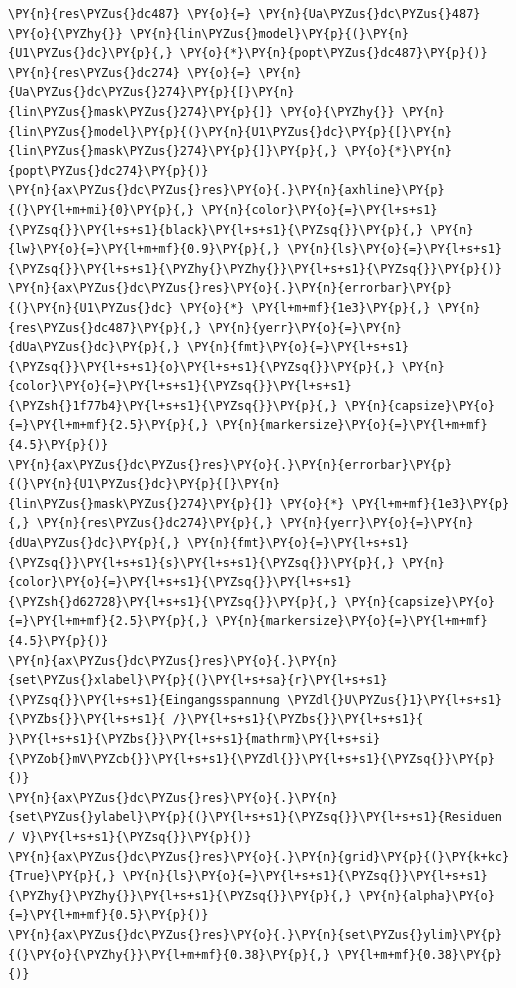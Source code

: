 \begin{tcolorbox}[breakable, size=fbox, boxrule=1pt, pad at break*=1mm,colback=cellbackground, colframe=cellborder]
\begin{Verbatim}[commandchars=\\\{\}]
\PY{n}{res\PYZus{}dc487} \PY{o}{=} \PY{n}{Ua\PYZus{}dc\PYZus{}487} \PY{o}{\PYZhy{}} \PY{n}{lin\PYZus{}model}\PY{p}{(}\PY{n}{U1\PYZus{}dc}\PY{p}{,} \PY{o}{*}\PY{n}{popt\PYZus{}dc487}\PY{p}{)}
\PY{n}{res\PYZus{}dc274} \PY{o}{=} \PY{n}{Ua\PYZus{}dc\PYZus{}274}\PY{p}{[}\PY{n}{lin\PYZus{}mask\PYZus{}274}\PY{p}{]} \PY{o}{\PYZhy{}} \PY{n}{lin\PYZus{}model}\PY{p}{(}\PY{n}{U1\PYZus{}dc}\PY{p}{[}\PY{n}{lin\PYZus{}mask\PYZus{}274}\PY{p}{]}\PY{p}{,} \PY{o}{*}\PY{n}{popt\PYZus{}dc274}\PY{p}{)}
\PY{n}{ax\PYZus{}dc\PYZus{}res}\PY{o}{.}\PY{n}{axhline}\PY{p}{(}\PY{l+m+mi}{0}\PY{p}{,} \PY{n}{color}\PY{o}{=}\PY{l+s+s1}{\PYZsq{}}\PY{l+s+s1}{black}\PY{l+s+s1}{\PYZsq{}}\PY{p}{,} \PY{n}{lw}\PY{o}{=}\PY{l+m+mf}{0.9}\PY{p}{,} \PY{n}{ls}\PY{o}{=}\PY{l+s+s1}{\PYZsq{}}\PY{l+s+s1}{\PYZhy{}\PYZhy{}}\PY{l+s+s1}{\PYZsq{}}\PY{p}{)}
\PY{n}{ax\PYZus{}dc\PYZus{}res}\PY{o}{.}\PY{n}{errorbar}\PY{p}{(}\PY{n}{U1\PYZus{}dc} \PY{o}{*} \PY{l+m+mf}{1e3}\PY{p}{,} \PY{n}{res\PYZus{}dc487}\PY{p}{,} \PY{n}{yerr}\PY{o}{=}\PY{n}{dUa\PYZus{}dc}\PY{p}{,} \PY{n}{fmt}\PY{o}{=}\PY{l+s+s1}{\PYZsq{}}\PY{l+s+s1}{o}\PY{l+s+s1}{\PYZsq{}}\PY{p}{,} \PY{n}{color}\PY{o}{=}\PY{l+s+s1}{\PYZsq{}}\PY{l+s+s1}{\PYZsh{}1f77b4}\PY{l+s+s1}{\PYZsq{}}\PY{p}{,} \PY{n}{capsize}\PY{o}{=}\PY{l+m+mf}{2.5}\PY{p}{,} \PY{n}{markersize}\PY{o}{=}\PY{l+m+mf}{4.5}\PY{p}{)}
\PY{n}{ax\PYZus{}dc\PYZus{}res}\PY{o}{.}\PY{n}{errorbar}\PY{p}{(}\PY{n}{U1\PYZus{}dc}\PY{p}{[}\PY{n}{lin\PYZus{}mask\PYZus{}274}\PY{p}{]} \PY{o}{*} \PY{l+m+mf}{1e3}\PY{p}{,} \PY{n}{res\PYZus{}dc274}\PY{p}{,} \PY{n}{yerr}\PY{o}{=}\PY{n}{dUa\PYZus{}dc}\PY{p}{,} \PY{n}{fmt}\PY{o}{=}\PY{l+s+s1}{\PYZsq{}}\PY{l+s+s1}{s}\PY{l+s+s1}{\PYZsq{}}\PY{p}{,} \PY{n}{color}\PY{o}{=}\PY{l+s+s1}{\PYZsq{}}\PY{l+s+s1}{\PYZsh{}d62728}\PY{l+s+s1}{\PYZsq{}}\PY{p}{,} \PY{n}{capsize}\PY{o}{=}\PY{l+m+mf}{2.5}\PY{p}{,} \PY{n}{markersize}\PY{o}{=}\PY{l+m+mf}{4.5}\PY{p}{)}
\PY{n}{ax\PYZus{}dc\PYZus{}res}\PY{o}{.}\PY{n}{set\PYZus{}xlabel}\PY{p}{(}\PY{l+s+sa}{r}\PY{l+s+s1}{\PYZsq{}}\PY{l+s+s1}{Eingangsspannung \PYZdl{}U\PYZus{}1}\PY{l+s+s1}{\PYZbs{}}\PY{l+s+s1}{ /}\PY{l+s+s1}{\PYZbs{}}\PY{l+s+s1}{ }\PY{l+s+s1}{\PYZbs{}}\PY{l+s+s1}{mathrm}\PY{l+s+si}{\PYZob{}mV\PYZcb{}}\PY{l+s+s1}{\PYZdl{}}\PY{l+s+s1}{\PYZsq{}}\PY{p}{)}
\PY{n}{ax\PYZus{}dc\PYZus{}res}\PY{o}{.}\PY{n}{set\PYZus{}ylabel}\PY{p}{(}\PY{l+s+s1}{\PYZsq{}}\PY{l+s+s1}{Residuen / V}\PY{l+s+s1}{\PYZsq{}}\PY{p}{)}
\PY{n}{ax\PYZus{}dc\PYZus{}res}\PY{o}{.}\PY{n}{grid}\PY{p}{(}\PY{k+kc}{True}\PY{p}{,} \PY{n}{ls}\PY{o}{=}\PY{l+s+s1}{\PYZsq{}}\PY{l+s+s1}{\PYZhy{}\PYZhy{}}\PY{l+s+s1}{\PYZsq{}}\PY{p}{,} \PY{n}{alpha}\PY{o}{=}\PY{l+m+mf}{0.5}\PY{p}{)}
\PY{n}{ax\PYZus{}dc\PYZus{}res}\PY{o}{.}\PY{n}{set\PYZus{}ylim}\PY{p}{(}\PY{o}{\PYZhy{}}\PY{l+m+mf}{0.38}\PY{p}{,} \PY{l+m+mf}{0.38}\PY{p}{)}


\end{Verbatim}
\end{tcolorbox}
